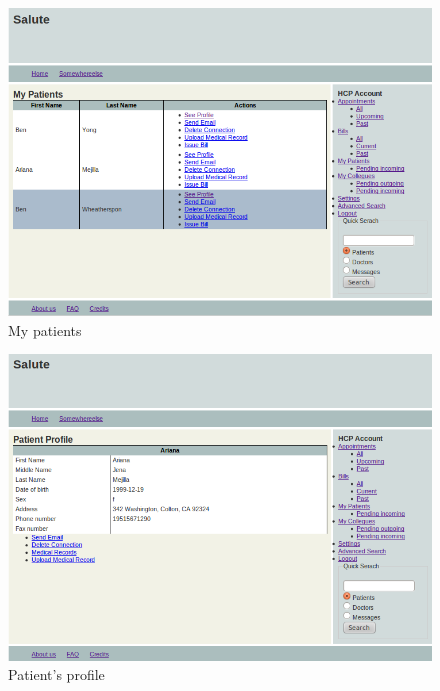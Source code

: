 \documentclass[10pt]{report}
\begin{document}
\begin{figure}
\includegraphics[scale=0.6]{screenshots/my_patients.png}
\caption{My patients}
\end{figure}

\begin{figure}
\includegraphics[scale=0.6]{screenshots/patients_profile.png}
\caption{Patient's profile}
\end{figure}
\end{document}
